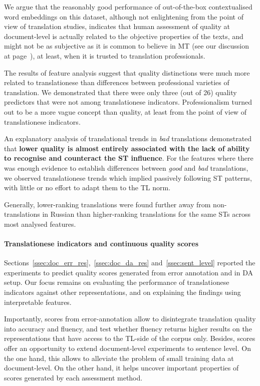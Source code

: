 We argue that the reasonably good performance of out-of-the-box contextualised word embeddings on this dataset, although not enlightening from the point of view of translation studies, indicates that human assessment of quality at document-level is actually related to the objective properties of the texts, and might not be as subjective as it is common to believe in MT (see our discussion at page~\pageref{pg:pessimism}), at least, when it is trusted to translation professionals. 

The results of feature analysis suggest that quality distinctions were much more related to translationese than differences between professional varieties of translation. 
We demonstrated that there were only three (out of 26) quality predictors that were not among translationese indicators. Professionalism turned out to be a more vague concept than quality, at least from the point of view of translationese indicators.

An explanatory analysis of translational trends in \textit{bad} translations demonstrated that \textbf{lower quality is almost entirely associated with the lack of ability to recognise and counteract the ST influence}. For the features where there was enough evidence to establish differences between \textit{good} and \textit{bad} translations, we observed translationese trends which implied passively following ST patterns, with little or no effort to adapt them to the TL norm.
 
Generally, lower-ranking translations were found further away from non-translations in Russian than higher-ranking translations for the same STs across most analysed features.  
\paragraph{Translationese indicators and continuous quality scores}
Sections~\ref{ssec:doc_err_res},~\ref{ssec:doc_da_res} and~\ref{ssec:sent_level} reported the experiments to predict quality scores generated from error annotation and in DA setup. Our focus remains on evaluating the performance of translationese indicators against other representations, and on explaining the findings using interpretable features.

Importantly, scores from error-annotation allow to disintegrate translation quality into accuracy and fluency, and test whether fluency returns higher results on the representations that have access to the TL-side of the corpus only. 
Besides, scores offer an opportunity to extend document-level experiments to sentence level. On the one hand, this allows to alleviate the problem of small training data at document-level. On the other hand, it helps uncover important properties of scores generated by each assessment method.

